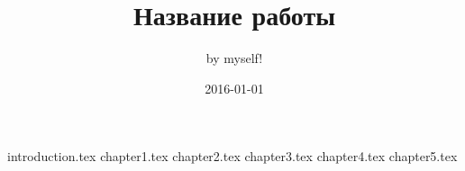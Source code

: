 \documentclass[a4paper,14pt]{extarticle}
\title {Название работы}
\date {2016-01-01}
\author {by myself!}
\begin{document}
	\maketitle
	\clearpage
	\setcounter{page}{2}
	\tableofcontents
	\clearpage
	 {introduction.tex}
	\clearpage
	 {chapter1.tex}
	\clearpage
	 {chapter2.tex}
	\clearpage
	 {chapter3.tex}
	\clearpage
            {chapter4.tex}
	\clearpage
            {chapter5.tex}
	\clearpage
	\renewcommand{\refname}{Список использованных источников}
	
	
\end{document}
